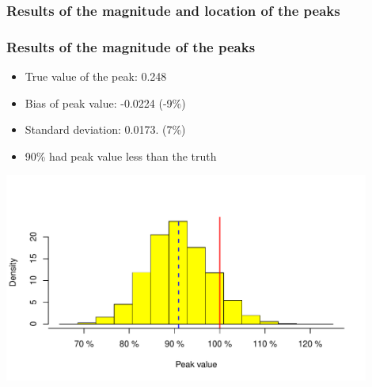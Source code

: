 \documentclass{beamer}
\begin{document}
\subsubsection{Results of the magnitude and location of the peaks}

\begin{frame}\frametitle{Results of the magnitude of the peaks}
    \begin{itemize}
        \item True value of the peak: 0.248
        \item Bias of peak value: -0.0224 (-9\%)
        \item Standard deviation: 0.0173. (7\%)
        \item 90\% had peak value \alert{less than} the truth
    \end{itemize}
    \begin{example}
    \centerline{
        \label{fig:peaks-values-hist}
        \centering
        \includegraphics[width=0.9\textwidth]{peaks-hist-values}
     }
    \end{example}
\end{frame}
\end{document}
